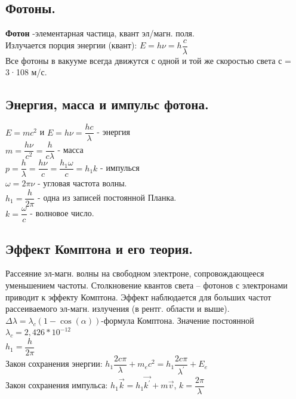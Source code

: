 \documentclass[12pt]{report}
\begin{document}
\subsection{Фотоны.}
\textbf{Фотон} -элементарная частица, квант эл/магн. поля.\\
Излучается порция энергии (квант): $E=h\nu=h\dfrac{c}{\lambda}$\\
Все фотоны в вакууме всегда движутся с одной и той же
скоростью света $с$ = 3·108 м/с.
\subsection{Энергия, масса и импульс фотона.}

$E=mc^2$ и $E=h\nu=\dfrac{hc}{\lambda}$ - энергия\\

$m=\dfrac{h\nu}{c^2}=\dfrac{h}{c\lambda}$ - масса\\

$p=\dfrac{h}{\lambda}=\dfrac{h\nu}{c}=\dfrac{h_1\omega}{c}=h_1k$ - импулься\\

$\omega=2\pi\nu$ - угловая частота волны.\\

$h_1 = \dfrac{h}{2\pi}$ - одна из записей постоянной Планка.\\

$k=\dfrac{\omega}{c}$ - волновое число.
\subsection{ Эффект Комптона и его теория.}
Рассеяние эл-магн. волны на свободном электроне, сопровождающееся
уменьшением частоты. Столкновение квантов света – фотонов с
электронами приводит к эффекту Комптона. Эффект наблюдается для больших частот рассеиваемого эл-магн. излучения (в рентг. области и выше).\\

$\Delta\lambda = \lambda_c(1-\cos(\alpha))$-формула Комптона.
Значение постоянной $\lambda_c = 2,426*10^{−12}$ \\

$h_1=\dfrac{h}{2\pi}$\\
Закон сохранения энергии:
$h_1\dfrac{2c\pi}{\lambda}+m_ec^2=h_1\dfrac{2c\pi}{\lambda^{'}}+E_e$\\
Закон сохранения импульса:
$h_1\overrightarrow{k}=h_1\overrightarrow{k^{'}} + m\overrightarrow{v}$, $k=\dfrac{2\pi}{\lambda}$\\
\end{document}
